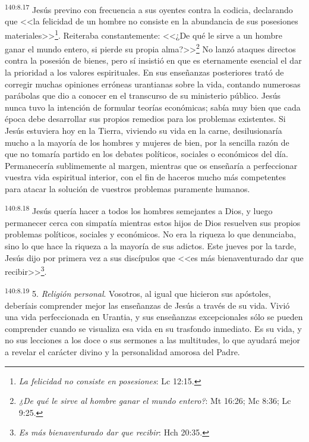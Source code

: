 \par 
\textsuperscript{140:8.17} Jesús previno con frecuencia a sus oyentes contra la codicia, declarando que <<la felicidad de un hombre no consiste en la abundancia de sus posesiones materiales>>\footnote{\textit{La felicidad no consiste en posesiones}: Lc 12:15.}. Reiteraba constantemente: <<¿De qué le sirve a un hombre ganar el mundo entero, si pierde su propia alma?>>\footnote{\textit{¿De qué le sirve al hombre ganar el mundo entero?}: Mt 16:26; Mc 8:36; Lc 9:25.} No lanzó ataques directos contra la posesión de bienes, pero sí insistió en que es eternamente esencial el dar la prioridad a los valores espirituales. En sus enseñanzas posteriores trató de corregir muchas opiniones erróneas urantianas sobre la vida, contando numerosas parábolas que dio a conocer en el transcurso de su ministerio público. Jesús nunca tuvo la intención de formular teorías económicas; sabía muy bien que cada época debe desarrollar sus propios remedios para los problemas existentes. Si Jesús estuviera hoy en la Tierra, viviendo su vida en la carne, desilusionaría mucho a la mayoría de los hombres y mujeres de bien, por la sencilla razón de que no tomaría partido en los debates políticos, sociales o económicos del día. Permanecería sublimemente al margen, mientras que os enseñaría a perfeccionar vuestra vida espiritual interior, con el fin de haceros mucho más competentes para atacar la solución de vuestros problemas puramente humanos.

\par 
\textsuperscript{140:8.18} Jesús quería hacer a todos los hombres semejantes a Dios, y luego permanecer cerca con simpatía mientras estos hijos de Dios resuelven sus propios problemas políticos, sociales y económicos. No era la riqueza lo que denunciaba, sino lo que hace la riqueza a la mayoría de sus adictos. Este jueves por la tarde, Jesús dijo por primera vez a sus discípulos que <<es más bienaventurado dar que recibir>>\footnote{\textit{Es más bienaventurado dar que recibir}: Hch 20:35.}.

\par 
\textsuperscript{140:8.19} 5. \textit{Religión personal}. Vosotros, al igual que hicieron sus apóstoles, deberíais comprender mejor las enseñanzas de Jesús a través de su vida. Vivió una vida perfeccionada en Urantia, y sus enseñanzas excepcionales sólo se pueden comprender cuando se visualiza esa vida en su trasfondo inmediato. Es su vida, y no sus lecciones a los doce o sus sermones a las multitudes, lo que ayudará mejor a revelar el carácter divino y la personalidad amorosa del Padre.

